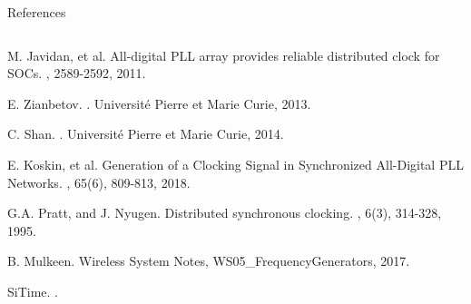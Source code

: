 \documentclass{beamer}
\begin{document}
\begin{frame}{References}
	\begin{columns}
		\begin{thebibliography}{10}
		\begin{tiny}
		M. Javidan, et al.
		\newblock All-digital PLL array provides reliable distributed clock for SOCs.
		, 2589-2592, 2011. %
  	
	    E. Zianbetov.
	    .
		\newblock Universit\'e Pierre et Marie Curie, 2013. %
		
		C. Shan.
		.
		\newblock Universit\'e Pierre et Marie Curie, 2014. %
		
	    E. Koskin, et al.
	    \newblock Generation of a Clocking Signal in Synchronized All-Digital PLL Networks.
	    , 65(6), 809-813, 2018. %

        G.A. Pratt, and J. Nyugen.
	    \newblock Distributed synchronous clocking.
        , 6(3), 314-328, 1995. %



	    B. Mulkeen.
	    \newblock Wireless System Notes, WS05\_FrequencyGenerators, 2017. %
	    
	    SiTime.
	    .
	    

\end{tiny}
\end{thebibliography}
\end{columns}
\end{frame}
\end{document}
